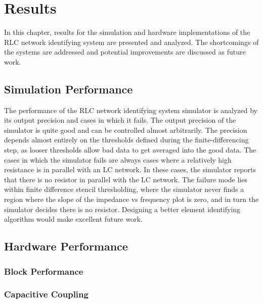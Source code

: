 \documentclass[11pt,twoside]{mitthesis}
\begin{document}
\fi

\chapter{Results}
In this chapter, results for the simulation and hardware implementations of the RLC network identifying system are presented and analyzed.
The shortcomings of the systems are addressed and potential improvements are discussed as future work.

\section{Simulation Performance}
The performance of the RLC network identifying system simulator is analyzed by its output precision and cases in which it fails.
The output precision of the simulator is quite good and can be controlled almost arbitrarily.
The precision depends almost entirely on the thresholds defined during the finite-differencing step, as looser thresholds allow bad data to get averaged into the good data.
The cases in which the simulator fails are always cases where a relatively high resistance is in parallel with an LC network.
In these cases, the simulator reports that there is no resistor in parallel with the LC network.
The failure mode lies within finite difference stencil thresholding, where the simulator never finds a region where the slope of the impedance vs frequency plot is zero, and in turn the simulator decides there is no resistor.
Designing a better element identifying algorithm would make excellent future work.

\section{Hardware Performance}
\subsection{Block Performance}
\subsubsection{}
\subsection{Capacitive Coupling}
\end{document}
